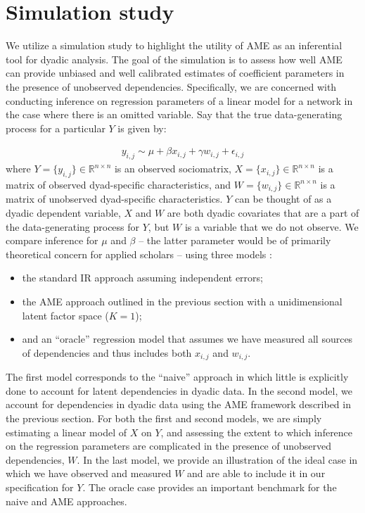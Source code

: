 \section{Simulation study}

We utilize a simulation study to highlight the utility of AME as an inferential tool for dyadic analysis. The goal of the simulation is to assess how well AME can provide unbiased and well calibrated estimates of coefficient parameters in the presence of unobserved dependencies. Specifically, we are concerned with conducting inference on regression parameters of a linear model for a network in the case where there is an omitted variable. Say that the true data-generating process for a particular $Y$ is given by:

\begin{align}
	y_{i,j} \sim  \mu + \beta x_{i,j} + \gamma w_{i,j} + \epsilon_{i,j}
	\label{eqn:sim}
\end{align}
where $Y= \{y_{i,j}\}\in \mathbb R^{n\times n}$ is an observed sociomatrix, $X = \{x_{i,j} \} \in \mathbb R^{n \times n}$ is a matrix of observed dyad-specific characteristics, and $W = \{ w_{i,j}\} \in \mathbb R^{n \times n}$ is a matrix of unobserved dyad-specific characteristics. $Y$ can be thought of as a dyadic dependent variable, $X$ and $W$ are both dyadic covariates that are a part of the data-generating process for $Y$, but $W$ is a variable that we do not observe. We compare inference for $\mu$ and $\beta$ -- the latter parameter would be of primarily theoretical concern for applied scholars -- using three models :

\begin{itemize}
	\item the standard IR approach assuming independent errors; 
	\item the AME approach outlined in the previous section with a unidimensional latent factor space ($K=1$);
	\item and an ``oracle'' regression model that assumes we have measured all sources of dependencies and thus includes both $x_{i,j}$ and $w_{i,j}$. 
\end{itemize}

The first model corresponds to the ``naive'' approach in which little is explicitly done to account for latent dependencies in dyadic data. In the second model, we account for dependencies in dyadic data using the AME framework described in the previous section. For both the first and second models, we are simply estimating a linear model of $X$ on $Y$, and assessing the extent to which inference on the regression parameters are complicated in the presence of unobserved dependencies, $W$. In the last model, we provide an illustration of the ideal case in which we have observed and measured $W$ and are able to include it in our specification for $Y$. The oracle case provides an important benchmark for the naive and AME approaches.

